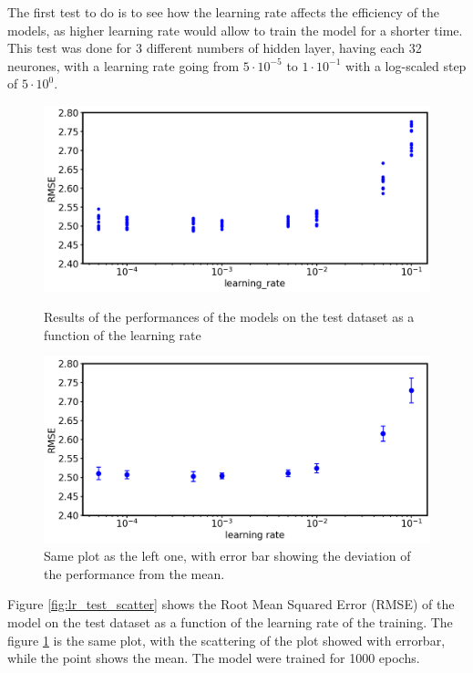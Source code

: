 \documentclass[a4paper, 11pt]{article}
\begin{document}
    The first test to do is to see how the learning rate affects the efficiency of the models, as higher learning rate would allow to train the model for a shorter time. This test was done for 3 different numbers of hidden layer, having each 32 neurones, with a learning rate going from $5\cdot10^{-5}$ to $1\cdot10^{-1}$ with a log-scaled step of $5\cdot10^{0}$.
    \begin{figure}[H]
    	\begin{minipage}[t]{.48\linewidth}
    		\centering 
    		\includegraphics[width=1\textwidth]{images/final_lr_test_scatter.png}
    		\caption{Results of the performances of the models on the test dataset as a function of the learning rate}
    		\label{fig:lr_test_scatter}
    	\end{minipage}
    	\hfill
    	\begin{minipage}[t]{.48\linewidth}
    		\centering 
    		\includegraphics[width=1\textwidth]{images/final_lr_test.png}
    		\caption{Same plot as the left one, with error bar showing the deviation of the performance from the mean.}
    		\label{fig:lr_test}
    	\end{minipage}
    \end{figure}
    Figure \ref{fig:lr_test_scatter} shows the Root Mean Squared Error (RMSE) of the model on the test dataset as a function of the learning rate of the training. The figure \ref{fig:lr_test} is the same plot, with the scattering of the plot showed with errorbar, while the point shows the mean. The model were trained for 1000 epochs. 
\end{document}
